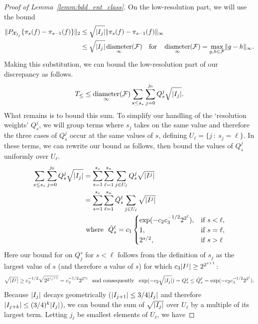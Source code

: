 \documentclass{article}
\DeclarePairedDelimiter\norm{\lVert}{\rVert}
\DeclarePairedDelimiter\abs{\lvert}{\rvert}
\theoremstyle{definition}
\newcommand{\calF}{\ensuremath{\mathcal{F}}}
\newcommand{\calX}{\ensuremath{\mathcal{X}}}
\DeclareMathOperator{\diameter}{diameter}
\newcommand{\diam}{\diameter}
\newcommand{\qfor}{\quad \text{for} \quad}
\newcommand{\<}{\langle}
\renewcommand{\>}{\rangle}
\begin{document}
\begin{refsection}
\begin{proof}[Proof of Lemma~\ref{lemm:bdd_ent_class}]
On the low-resolution part, we will use the bound
$$
\begin{aligned}
\norm{P_{\calX_{I_j}}\{ \pi_s(f) - \pi_{s-1}(f) \}}_2
&\le \sqrt{\abs{I_j}}\norm{\pi_s(f) - \pi_{s-1}(f)}_{\infty} \\
&\le \sqrt{\abs{I_j}}\diam_{\infty}(\calF) \qfor
\diam_{\infty}(\calF) = \max_{g,h\in \calF}\norm{g-h}_{\infty}.
\end{aligned}
$$
Making this substitution, we can bound the low-resolution part of our discrepancy as follows.
$$
T_{\le} \le \diam_{\infty}(\calF)  \sum_{s \le s_\star} \sum_{j=0}^{j_0} Q^{j}_s \sqrt{\abs{I_j}}.
$$
What remains is to bound this sum. To simplify our handling of the `resolution weights' $Q_s^j$, we will group terms where $s_j$ takes on the same value and therefore the three cases of $Q^j_s$ occur at the same values of $s$, defining $U_\ell = \{ j  \ : \ s_j = \ell \}$. In these terms, we can rewrite our bound as follows, then bound the values of $Q_s^j$ uniformly over $U_\ell$.
\begin{equation}
  \begin{aligned}
  \sum_{s \le s_\star} \sum_{j=0}^{j_0} Q^{j}_s \sqrt{\abs{I_j}}
  &= \sum_{s=1}^{s_\star} \sum_{\ell=1}^{s_n} \sum_{j \in U_\ell} Q_s^j \sqrt{\abs{I^j}} \\
  &= \sum_{s=1}^{s_\star} \sum_{\ell=1}^{s_n} \bar Q_s^\ell \sum_{j \in U_\ell}  \sqrt{\abs{I^j}}  \\
  &\text{ where } \ \bar Q^\ell_s = c_1
  \begin{cases}
  \exp(-c_2 c_3^{-1/2} 2^{2^{\ell}}), &\text{if } s<\ell,\\
  1, &\text{if } s = \ell,\\
  2^{s/2}, &\text{if } s>\ell
  \end{cases}
  \end{aligned}
\end{equation}
Here our bound for on $Q_j^s$ for $s < \ell$ follows from the definition of $s_j$ as the largest value of $s$ (and therefore \emph{a} value of $s$) for which $c_3\abs{I^j} \ge 2^{2^{s+1}}$:
$$
\sqrt{\abs{I^j} }\ge c_3^{-1/2} \sqrt{2^{2^{s_j+1}}} = c_3^{-1/2} 2^{2^{s_j}} \ \ \text{and consequently} \ \
\exp(-c_2\sqrt{\abs{I_j}}) = Q_s^j \le \bar Q^\ell_s = \exp(-c_2 c_3^{-1/2} 2^{2^{\ell}}).
$$
Because $\abs{I_j}$ decays geometrically ($\abs{I_{j+1}} \le 3/4\abs{I_j}$ and therefore $\abs{I_{j+k}} \le (3/4)^k \abs{I_{j}}$), we can bound the sum of $\sqrt{\abs{I_j}}$ over $U_\ell$ by a multiple of its largest term. Letting $j_{\ell}$ be smallest elements of $U_\ell$, we have

\end{proof}
\end{refsection}
\end{document}
